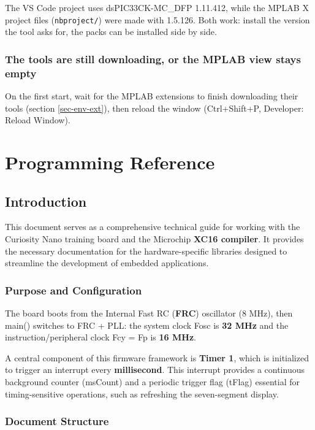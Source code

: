 \documentclass[
  11pt,
  letterpaper,
  oneside,
  DIV=13,               %
  parskip=half,          %
  headings=normal,
  chapterprefix=false,
  toc=listof,
  numbers=noenddot,
]{scrbook}
\begin{document}
The VS Code project uses dsPIC33CK-MC\_DFP 1.11.412, while the MPLAB X project files (\texttt{nbproject/\allowbreak{}}) were made with 1.5.126. Both work: install the version the tool asks for, the packs can be installed side by side.

\section{The tools are still downloading, or the MPLAB view stays empty}

On the first start, wait for the MPLAB extensions to finish downloading their tools (section \ref{sec-env-ext}), then reload the window (Ctrl+Shift+P, Developer: Reload Window).

\part{Programming Reference}\label{part-reference}

\chapter{Introduction}

This document serves as a comprehensive technical guide for working with the Curiosity Nano training board and the Microchip \textbf{XC16 compiler}. It provides the necessary documentation for the hardware-specific libraries designed to streamline the development of embedded applications.

\section{Purpose and Configuration}

The board boots from the Internal Fast RC (\textbf{FRC}) oscillator (8 MHz), then main() switches to FRC + PLL: the system clock Fosc is \textbf{32 MHz} and the instruction/peripheral clock Fcy = Fp is \textbf{16 MHz}.

A central component of this firmware framework is \textbf{Timer 1}, which is initialized to trigger an interrupt every \textbf{millisecond}. This interrupt provides a continuous background counter (msCount) and a periodic trigger flag (tFlag) essential for timing-sensitive operations, such as refreshing the seven-segment display.

\section{Document Structure}
\end{document}
